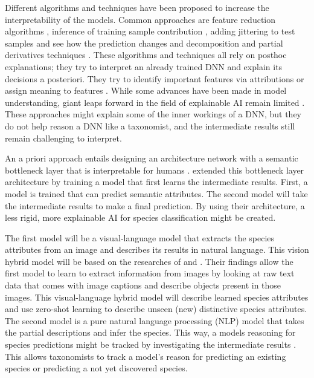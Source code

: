\documentclass[a4paper, 12pt, oneside]{book} %
\begin{document}
Different algorithms and techniques have been proposed to increase the interpretability of the models.
Common approaches are feature reduction algorithms \autocite{ribeiro_why_2016}, inference of training sample contribution \autocite{koh_understanding_2020}, adding jittering to test samples and see how the prediction changes \autocite{li_understanding_2017} and decomposition and partial derivatives techniques \autocite{samek_explainable_2017}.
These algorithms and techniques all rely on posthoc explanations; they try to interpret an already trained DNN and explain its decisions a posteriori.
They try to identify important features via attributions \autocite{zintgraf_visualizing_2017, selvaraju_grad-cam_2017} or assign meaning to features \autocite{fleet_visualizing_2014}.
While some advances have been made in model understanding, giant leaps forward in the field of explainable AI remain limited \autocite{lipton_mythos_2017, li_interpretable_2021}.
These approaches might explain some of the inner workings of a DNN, but they do not help reason a DNN like a taxonomist, and the intermediate results still remain challenging to interpret. 

An a priori approach entails designing an architecture network with a semantic bottleneck layer that is interpretable for humans \autocite{bucher_semantic_2019}. 
\textcite{ishikawa_contextual_2021} extended this bottleneck layer architecture by training a model that first learns the intermediate results.
First, a model is trained that can predict semantic attributes.
The second model will take the intermediate results to make a final prediction.
By using their architecture, a less rigid, more explainable AI for species classification might be created.

The first model will be a visual-language model that extracts the species attributes from an image and describes its results in natural language. 
This vision hybrid model will be based on the researches of \textcite{radford_learning_2021} and \textcite{huang_interpretable_2020}.
Their findings allow the first model to learn to extract information from images by looking at raw text data that comes with image captions and describe objects present in those images.
This visual-language hybrid model will describe learned species attributes and use zero-shot learning to describe unseen (new) distinctive species attributes.
The second model is a pure natural language processing (NLP) model that takes the partial descriptions and infer the species.
This way, a models reasoning for species predictions might be tracked by investigating the intermediate results \autocite{ishikawa_contextual_2021}.
This allows taxonomists to track a model's reason for predicting an existing species or predicting a not yet discovered species.
\end{document}
